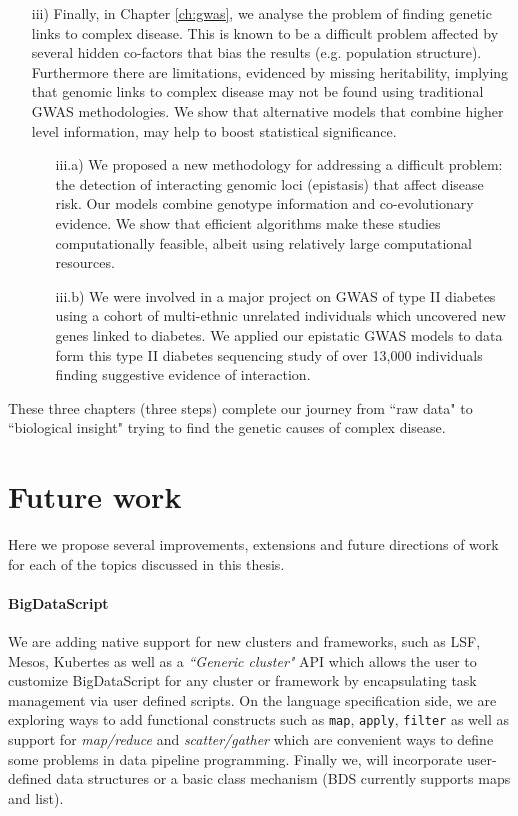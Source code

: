 \begin{itemize}
\item[iii)] Finally, in Chapter \ref{ch:gwas}, we analyse the problem of finding genetic links to complex disease. 
This is known to be a difficult problem affected by several hidden co-factors that bias the results (e.g. population structure). 
Furthermore there are limitations, evidenced by missing heritability, implying that genomic links to complex disease may not be found using traditional GWAS methodologies. 
We show that alternative models that combine higher level information, may help to boost statistical significance. 

	\begin{itemize}
		\item[iii.a)] We proposed a new methodology for addressing a difficult problem: the detection of interacting genomic loci (epistasis) that affect disease risk. 
		Our models combine genotype information and co-evolutionary evidence. We show that efficient algorithms make these studies computationally feasible, albeit using relatively large computational resources.
	
		\item[iii.b)] We were involved in a major project on GWAS of type II diabetes using a cohort of multi-ethnic unrelated individuals which uncovered new genes linked to diabetes. 
		We applied our epistatic GWAS models to data form this type II diabetes sequencing study of over 13,000 individuals finding suggestive evidence of interaction.
			\end{itemize}
	
\end{itemize}

These three chapters (three steps) complete our journey from ``raw data" to ``biological insight" trying to find the genetic causes of complex disease.

\section{Future work}

Here we propose several improvements, extensions and future directions of work for each of the topics discussed in this thesis. \\

\paragraph{BigDataScript}
We are adding native support for new clusters and frameworks, such as LSF, Mesos, Kubertes as well as a \textit{``Generic cluster"} API which allows the user to customize BigDataScript for any cluster or framework by encapsulating task management via user defined scripts. 
On the language specification side, we are exploring ways to add functional constructs such as \texttt{map}, \texttt{apply}, \texttt{filter} as well as support for \textit{map/reduce} and \textit{scatter/gather} which are convenient ways to define some problems in data pipeline programming. 
Finally we, will incorporate user-defined data structures or a basic class mechanism (BDS currently supports maps and list).


